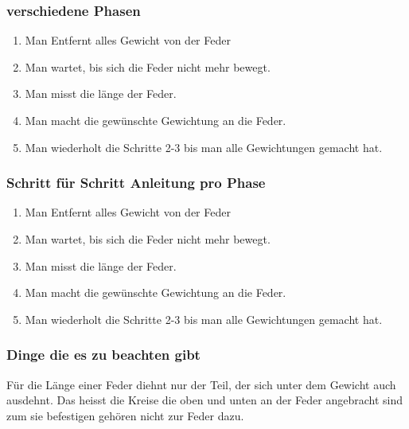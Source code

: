 \documentclass[../main.tex]{subfiles} %
\begin{document}
        \subsubsection{verschiedene Phasen}\label{subsubsec:schritt-fur-schritt-anleitung}
        \begin{enumerate}
            \item Man Entfernt alles Gewicht von der Feder
            \item Man wartet, bis sich die Feder nicht mehr bewegt.
            \item Man misst die länge der Feder.
            \item Man macht die gewünschte Gewichtung an die Feder.
            \item Man wiederholt die Schritte 2-3 bis man alle Gewichtungen gemacht hat.
        \end{enumerate}

        \subsubsection{Schritt für Schritt Anleitung pro Phase}\label{subsubsec:schritt-fur-schritt-anleitung2}
        \begin{enumerate}
            \item Man Entfernt alles Gewicht von der Feder
            \item Man wartet, bis sich die Feder nicht mehr bewegt.
            \item Man misst die länge der Feder.
            \item Man macht die gewünschte Gewichtung an die Feder.
            \item Man wiederholt die Schritte 2-3 bis man alle Gewichtungen gemacht hat.
        \end{enumerate}

        \subsubsection{Dinge die es zu beachten gibt}\label{subsubsec:dinge-die-es-zu-beachten-gibt}
        Für die Länge einer Feder diehnt nur der Teil, der sich unter dem Gewicht auch ausdehnt.
        Das heisst die Kreise die oben und unten an der Feder angebracht sind zum sie befestigen gehören nicht zur Feder dazu.
\end{document}
